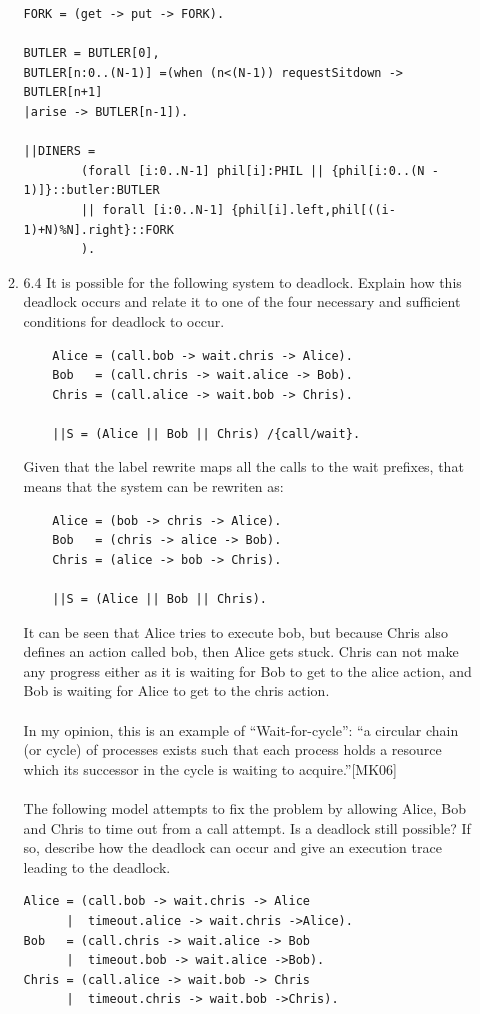 \documentclass{article}
\begin{document}
\begin{enumerate}
\begin{enumerate}
\begin{verbatim}
FORK = (get -> put -> FORK).

BUTLER = BUTLER[0],
BUTLER[n:0..(N-1)] =(when (n<(N-1)) requestSitdown -> BUTLER[n+1]
|arise -> BUTLER[n-1]).

||DINERS =
        (forall [i:0..N-1] phil[i]:PHIL || {phil[i:0..(N - 1)]}::butler:BUTLER
        || forall [i:0..N-1] {phil[i].left,phil[((i-1)+N)%N].right}::FORK
        ).  
\end{verbatim}
\item 6.4
  It is possible for the following system to deadlock. Explain how this deadlock occurs and relate it to one of the four necessary and sufficient conditions for deadlock to occur.
    \begin{verbatim}
    Alice = (call.bob -> wait.chris -> Alice).
    Bob   = (call.chris -> wait.alice -> Bob).
    Chris = (call.alice -> wait.bob -> Chris).

    ||S = (Alice || Bob || Chris) /{call/wait}.
\end{verbatim}
    Given that the label rewrite maps all the calls to the wait prefixes, that means that the system can be rewriten as:
    \begin{verbatim}
    Alice = (bob -> chris -> Alice).
    Bob   = (chris -> alice -> Bob).
    Chris = (alice -> bob -> Chris).

    ||S = (Alice || Bob || Chris).
\end{verbatim}
    It can be seen that Alice tries to execute bob, but because Chris also defines an action called bob, then Alice gets stuck.
    Chris can not make any progress either as it is waiting for Bob to get to the alice action, and Bob is waiting for Alice to get to the chris action. \\
    \\
    In my opinion, this is an example of ``Wait-for-cycle'': ``a circular chain (or cycle) of processes exists such that each process holds a resource which its successor in the cycle is waiting to acquire.''[MK06]\\
    \\
The following model attempts to fix the problem by allowing Alice, Bob and Chris to time out from a call attempt. Is a deadlock still possible? If so, describe how the deadlock can occur and give an execution trace leading to the deadlock.

\begin{verbatim}    
Alice = (call.bob -> wait.chris -> Alice          
      |  timeout.alice -> wait.chris ->Alice).    
Bob   = (call.chris -> wait.alice -> Bob          
      |  timeout.bob -> wait.alice ->Bob).    
Chris = (call.alice -> wait.bob -> Chris          
      |  timeout.chris -> wait.bob ->Chris).    


\end{verbatim}
\end{enumerate}
\end{enumerate}
\end{document}
